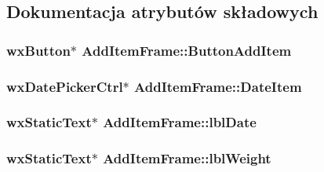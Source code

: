 \subsection{Dokumentacja atrybutów składowych}
\hypertarget{class_add_item_frame_a35bd911645a80d7082315998cb6cbfb7}{
\subsubsection[{Button\+Add\+Item}]{\setlength{\rightskip}{0pt plus 5cm}wx\+Button$\ast$ Add\+Item\+Frame\+::\+Button\+Add\+Item\hspace{0.3cm}{\ttfamily [protected]}}}\label{class_add_item_frame_a35bd911645a80d7082315998cb6cbfb7}
\hypertarget{class_add_item_frame_a8096f40b89662727687011b68c2ea955}{
\subsubsection[{Date\+Item}]{\setlength{\rightskip}{0pt plus 5cm}wx\+Date\+Picker\+Ctrl$\ast$ Add\+Item\+Frame\+::\+Date\+Item\hspace{0.3cm}{\ttfamily [protected]}}}\label{class_add_item_frame_a8096f40b89662727687011b68c2ea955}
\hypertarget{class_add_item_frame_ad08250f82a948ebff2f65d60c45c7f54}{
\subsubsection[{lbl\+Date}]{\setlength{\rightskip}{0pt plus 5cm}wx\+Static\+Text$\ast$ Add\+Item\+Frame\+::lbl\+Date\hspace{0.3cm}{\ttfamily [protected]}}}\label{class_add_item_frame_ad08250f82a948ebff2f65d60c45c7f54}
\hypertarget{class_add_item_frame_a6a9da7cb41a654ae06ea7e64676db36f}{
\subsubsection[{lbl\+Weight}]{\setlength{\rightskip}{0pt plus 5cm}wx\+Static\+Text$\ast$ Add\+Item\+Frame\+::lbl\+Weight\hspace{0.3cm}{\ttfamily [protected]}}}\label{class_add_item_frame_a6a9da7cb41a654ae06ea7e64676db36f}
